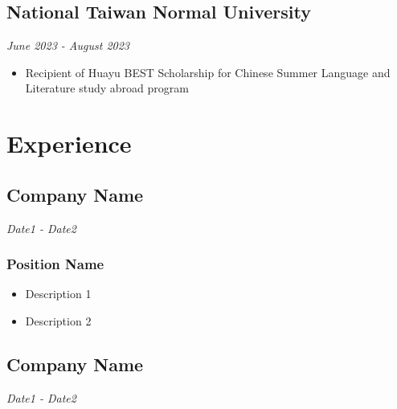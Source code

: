 \documentclass{article}
\renewcommand{\date}[1]{
    \hfill{\normalsize\textit{#1}}
}
\begin{document}
        \subsection{National Taiwan Normal University}\date{June 2023 - August 2023}
            \begin{itemize}
                \item Recipient of Huayu BEST Scholarship for Chinese Summer Language and Literature study abroad program
            \end{itemize}
    \section{Experience}
        \subsection{Company Name}\date{Date1 - Date2} %
            \subsubsection{Position Name}
                \begin{itemize}
                    \item Description 1
                    \item Description 2
                \end{itemize}
        \subsection{Company Name}\date{Date1 - Date2} %
\end{document}
